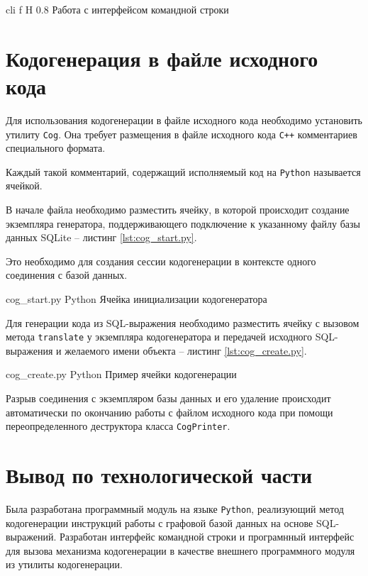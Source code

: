 {cli}
{f}
{H}
{0.8\textwidth}
{Работа с интерфейсом командной строки}

\section{Кодогенерация в файле исходного кода}
Для использования кодогенерации в файле исходного кода необходимо установить утилиту \texttt{Cog}.
Она требует размещения в файле исходного кода \texttt{C++} комментариев специального формата.

Каждый такой комментарий, содержащий исполняемый код на \texttt{Python} называется ячейкой.

В начале файла необходимо разместить ячейку, в которой происходит создание экземпляра генератора, поддерживающего подключение к указанному файлу базы данных SQLite -- листинг \ref{lst:cog_start.py}.

Это необходимо для создания сессии кодогенерации в контексте одного соединения с базой данных.

{cog_start.py}
{Python}
{Ячейка инициализации кодогенератора}

Для генерации кода из SQL-выражения необходимо разместить ячейку с вызовом метода \texttt{translate} у экземпляра кодогенератора и передачей исходного SQL-выражения и желаемого имени объекта -- листинг \ref{lst:cog_create.py}.

{cog_create.py}
{Python}
{Пример ячейки кодогенерации}

Разрыв соединения с экземпляром базы данных и его удаление происходит автоматически по окончанию работы с файлом исходного кода при помощи переопределенного деструктора класса \texttt{CogPrinter}.

\section*{Вывод по технологической части}
Была разработана программный модуль на языке \texttt{Python}, реализующий метод кодогенерации инструкций работы с графовой базой данных на основе SQL-выражений.
Разработан интерфейс командной строки и програмнный интерфейс для вызова механизма кодогенерации в качестве внешнего программного модуля из утилиты кодогенерации.